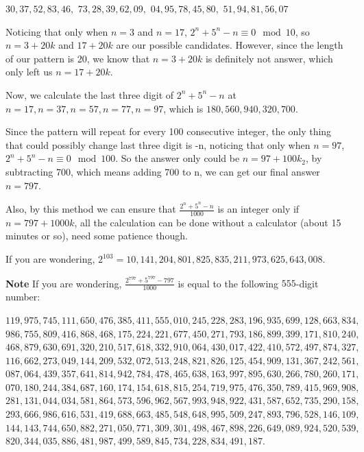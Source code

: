 \begin{enumerate}
 $30{,}37{,}52{,}83{,}46{,}$
$73{,}28{,}39{,}62{,}09{,}$
$04{,}95{,}78{,}45{,}80{,}$
$51{,}94{,}81{,}56{,}07$

 Noticing that only when $n=3$ and $n=17$, $2^n+5^n-n \equiv 0 \mod{10}$, so $n=3+20k$ and $17+20k$ are our possible candidates. However, since the length of our pattern is 20, we know that $n=3+20k$ is definitely not answer, which only left us $n=17+20k$.

 Now, we calculate the last three digit of $2^n+5^n-n$ at $n=17, n=37, n=57, n=77, n=97$, which is $180{,}560{,}940{,}320{,}700$.

 Since the pattern will repeat for every 100 consecutive integer, the only thing that could possibly change last three digit is -n, noticing that only when $n=97$, $2^n+5^n-n \equiv 0 \mod 100$. So the answer only could be $n=97+100k_2$, by subtracting 700, which means adding 700 to n, we can get our final answer $n=\boxed{797}$.

 Also, by this method we can ensure that $\frac{2^n+5^n-n}{1000}$ is an integer only if $n=797+1000k$, all the calculation can be done without a calculator (about 15 minutes or so), need some patience though.

 If you are wondering, $2^{103} = 10{,}141{,}204{,}801{,}825{,}835{,}211{,}973{,}625{,}643{,}008$.

 \textbf{Note} If you are wondering, $\frac{2^{797}+5^{797}-797}{1000}$ is equal to the following $555$-digit number:

 $119{,}975{,}745{,}111{,}650{,}476{,}385{,}411{,}555{,}010{,}245{,}228{,}283{,}196{,}935{,}699{,}128{,}663{,}834{,}$$986{,}755{,}809{,}416{,}868{,}468{,}175{,}224{,}221{,}677{,}450{,}271{,}793{,}186{,}899{,}399{,}171{,}810{,}240{,}$$468{,}879{,}630{,}691{,}320{,}210{,}517{,}618{,}332{,}910{,}064{,}430{,}017{,}422{,}410{,}572{,}497{,}874{,}327{,}$$116{,}662{,}273{,}049{,}144{,}209{,}532{,}072{,}513{,}248{,}821{,}826{,}125{,}454{,}909{,}131{,}367{,}242{,}561{,}$$087{,}064{,}439{,}357{,}641{,}814{,}942{,}784{,}478{,}465{,}638{,}163{,}997{,}895{,}630{,}266{,}780{,}260{,}171{,}$$070{,}180{,}244{,}384{,}687{,}160{,}174{,}154{,}618{,}815{,}254{,}719{,}975{,}476{,}350{,}789{,}415{,}969{,}908{,}$$281{,}131{,}044{,}034{,}581{,}864{,}573{,}596{,}962{,}567{,}993{,}948{,}922{,}431{,}587{,}652{,}735{,}290{,}158{,}$$293{,}666{,}986{,}616{,}531{,}419{,}688{,}663{,}485{,}548{,}648{,}995{,}509{,}247{,}893{,}796{,}528{,}146{,}109{,}$$144{,}143{,}744{,}650{,}882{,}271{,}050{,}771{,}309{,}301{,}498{,}467{,}898{,}226{,}649{,}089{,}924{,}520{,}539{,}$$820{,}344{,}035{,}886{,}481{,}987{,}499{,}589{,}845{,}734{,}228{,}834{,}491{,}187.$


\end{enumerate}
